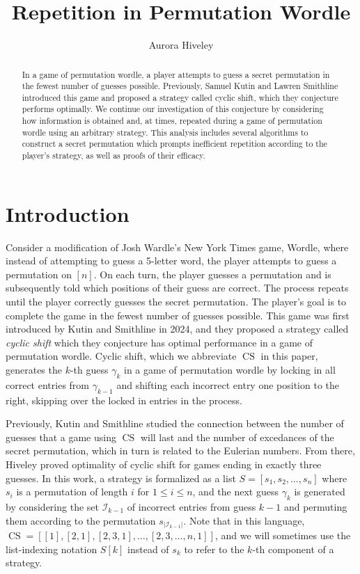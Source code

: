 \documentclass[article]{amsart}
\title{Repetition in Permutation Wordle}
\author[Hiveley]{Aurora Hiveley}
\theoremstyle{plain}
\DeclareMathOperator{\CS}{CS}
\begin{document}
\begin{abstract}
In a game of permutation wordle, a player attempts to guess a secret permutation in the fewest number of guesses possible. Previously, Samuel Kutin and Lawren Smithline \cite{kutin2024} introduced this game and proposed a strategy called cyclic shift, which they conjecture performs optimally. We continue our investigation of this conjecture by considering how information is obtained and, at times, repeated during a game of permutation wordle using an arbitrary strategy. This analysis includes several algorithms to construct a secret permutation which prompts inefficient repetition according to the player's strategy, as well as proofs of their efficacy.
\end{abstract}


\maketitle

\section{Introduction} \label{sec:intro}
Consider a modification of Josh Wardle's New York Times game, Wordle, where instead of attempting to guess a 5-letter word, the player attempts to guess a permutation on $[n]$. On each turn, the player guesses a permutation and is subsequently told which positions of their guess are correct. The process repeats until the player correctly guesses the secret permutation. The player's goal is to complete the game in the fewest number of guesses possible. This game was first introduced by Kutin and Smithline in 2024, and they proposed a strategy called \textit{cyclic shift} which they conjecture has optimal performance in a game of permutation wordle. Cyclic shift, which we abbreviate $\CS$ in this paper, generates the $k$-th guess $\gamma_k$ in a game of permutation wordle by locking in all correct entries from $\gamma_{k-1}$ and shifting each incorrect entry one position to the right, skipping over the locked in entries in the process.

Previously, Kutin and Smithline studied the connection between the number of guesses that a game using $\CS$ will last and the number of excedances of the secret permutation, which in turn is related to the Eulerian numbers. From there, Hiveley \cite{hiveley2025} proved optimality of cyclic shift for games ending in exactly three guesses. In this work, a strategy is formalized as a list $S = [s_1, s_2, \dots, s_n]$ where $s_i$ is a permutation of length $i$ for $1 \leq i \leq n$, and the next guess $\gamma_{k}$ is generated by considering the set $\mathcal{I}_{k-1}$ of incorrect entries from guess $k-1$ and permuting them according to the permutation $s_{|\mathcal{I}_{k-1}|}$. Note that in this language, $\CS = [[1], [2,1], [2,3,1], \dots, [2,3,\dots, n, 1]]$, and we will sometimes use the list-indexing notation $S[k]$ instead of $s_k$ to refer to the $k$-th component of a strategy. 
\end{document}
